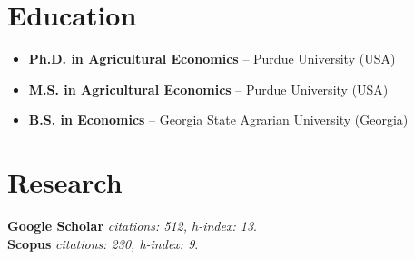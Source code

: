 \documentclass[10pt]{article}
\begin{document}
	
	\section*{Education}
	\begin{itemize}
		\item {} \textbf{Ph.D. in Agricultural Economics} -- Purdue University (USA)
		\item {} \textbf{M.S. in Agricultural Economics} -- Purdue University (USA)
		\item {} \textbf{B.S. in Economics} -- Georgia State Agrarian University (Georgia)
	\end{itemize}
	
	\bigskip
	
	\section*{Research}
	\textbf{Google Scholar} \textsl{citations: 512, h-index: 13}.\\	
	\textbf{Scopus} \textsl{citations: 230, h-index: 9}.	
	
	\begin{refsection}[papers]
		\nocite{ubilava2019el,ubilava2019erl,ubilava2019md,ubilava2018ajae,smith2017gec,ubilava2017wd,tack2015agec,ubilava2014erae,tack2013cc,ubilava2013ems,ubilava2013ajare,ubilava2012agec,ubilava2012agri,ubilava2011jare,ubilava2011jcb,ubilava2010tfsc,ubilava2009fp}
		\printbibliography[heading={papers}]
	\end{refsection}
	\begin{refsection}[papers]
		\nocite{signal_noise,multistep_forecasts,somalia_integration,conflict_seasonal}
		\printbibliography[heading={inprogress},env={nodis}]
	\end{refsection}

	
\end{document}
